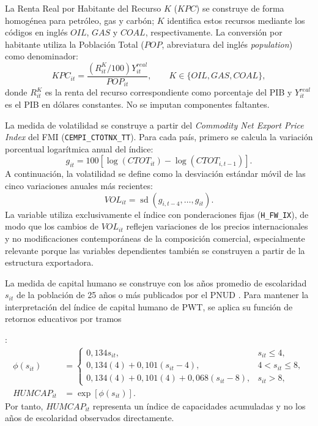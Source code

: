\documentclass[../../TFM.tex]{subfiles}
\begin{document}
	La Renta Real por Habitante del Recurso $K$ ($KPC$) se construye de forma
	homogénea para petróleo, gas y carbón; $K$ identifica estos recursos mediante
	los códigos en inglés $OIL$, $GAS$ y $COAL$, respectivamente. La conversión
	por habitante utiliza la Población Total ($POP$, abreviatura del inglés
	\textit{population}) como denominador:
	\[
		KPC_{it}
		=
		\frac{
			\left(R^{K}_{it}/100\right)Y^{real}_{it}
		}{
			POP_{it}
		},
		\qquad
		K\in\{OIL,GAS,COAL\},
	\]
	donde $R^{K}_{it}$ es la renta del recurso correspondiente como porcentaje
	del PIB y $Y^{real}_{it}$ es el PIB en dólares constantes. No se imputan
	componentes faltantes.

	La medida de volatilidad se construye a partir del
	\textit{Commodity Net Export Price Index} del FMI
	(\texttt{CEMPI\_CTOTNX\_TT}). Para cada país, primero se calcula la
	variación porcentual logarítmica anual del índice:
	\[
		g_{it}
		=
		100\left[
			\log(CTOT_{it})
			-
			\log(CTOT_{i,t-1})
		\right].
	\]
	A continuación, la volatilidad se define como la desviación estándar
	móvil de las cinco variaciones anuales más recientes:
	\[
		VOL_{it}
		=
		\operatorname{sd}\left(
			g_{i,t-4},
			\ldots,
			g_{it}
		\right).
	\]
	La variable utiliza exclusivamente el índice con ponderaciones fijas
	(\texttt{H\_FW\_IX}), de modo que los cambios de $VOL_{it}$ reflejen
	variaciones de los precios internacionales y no modificaciones
	contemporáneas de la composición comercial, especialmente relevante porque
	las variables dependientes también se construyen a partir de la estructura
	exportadora.

	La medida de capital humano se construye con los años promedio de escolaridad
	$s_{it}$ de la población de 25 años o más publicados por el PNUD
	\parencite{UNDPUnitedNationsDevelopmentProgramme2025}. Para mantener la interpretación del índice de capital
	humano de PWT, se aplica su función de retornos educativos por tramos
	\colorbox{yellow!50}{\strut\parencite{GGDCHumanCapital2016}}:
	\[
		\begin{aligned}
			\phi(s_{it})
			&=
			\begin{cases}
				0{,}134s_{it}, & s_{it}\leq4,\\
				0{,}134(4)+0{,}101(s_{it}-4), & 4<s_{it}\leq8,\\
				0{,}134(4)+0{,}101(4)+0{,}068(s_{it}-8), & s_{it}>8,
			\end{cases}\\[0.4em]
			HUMCAP_{it}
			&=\exp\!\left[\phi(s_{it})\right].
		\end{aligned}
	\]
	Por tanto, $HUMCAP_{it}$ representa un índice de capacidades acumuladas y no
	los años de escolaridad observados directamente.
\end{document}
